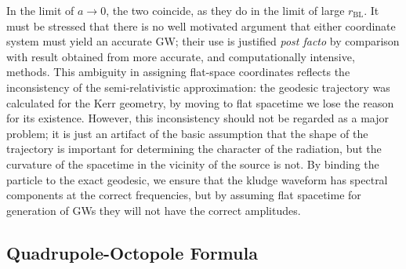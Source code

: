 \documentclass[a4paper, 11pt, titlepage, twoside]{report}
\newcommand{\sub}[1]{\ensuremath{_\mathrm{#1}}}
\begin{document}
In the limit of $a \rightarrow 0$, the two coincide, as they do in the limit of large $r\sub{BL}$. It must be stressed that there is no well motivated argument that either coordinate system must yield an accurate GW; their use is justified {\it post facto} by comparison with result obtained from more accurate, and computationally intensive, methods\cite{Gair2005, Babak2007}. This ambiguity in assigning flat-space coordinates reflects the inconsistency of the semi-relativistic approximation: the geodesic trajectory was calculated for the Kerr geometry, by moving to flat spacetime we lose the reason for its existence. However, this inconsistency should not be regarded as a major problem; it is just an artifact of the basic assumption that the shape of the trajectory is important for determining the character of the radiation, but the curvature of the spacetime in the vicinity of the source is not. By binding the particle to the exact geodesic, we ensure that the kludge waveform has spectral components at the correct frequencies, but by assuming flat spacetime for generation of GWs they will not have the correct amplitudes.

\subsection{Quadrupole-Octopole Formula}
\end{document}
